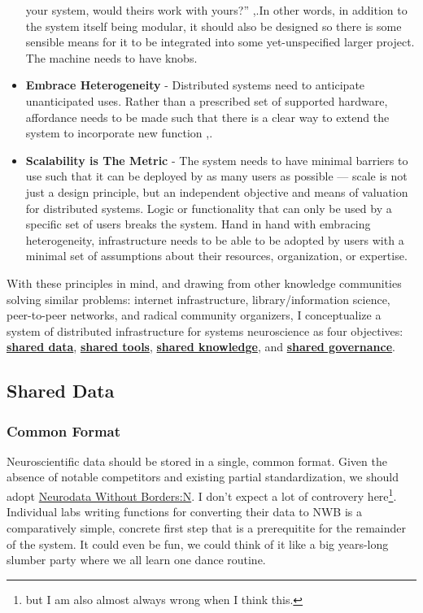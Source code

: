\documentclass{article}
\begin{document}
\begin{itemize}
  your system, would theirs work with yours?'' \cite{berners-leePrinciplesDesign1998},.In other words, in addition to
  the system itself being modular, it should also be designed so there
  is some sensible means for it to be integrated into some
  yet-unspecified larger project. The machine needs to have knobs.
\item
  \textbf{Embrace Heterogeneity} - Distributed systems need to
  anticipate unanticipated uses. Rather than a prescribed set of
  supported hardware, affordance needs to be made such that there is a
  clear way to extend the system to incorporate new function \cite{carpenterRFC1958Architectural1996},.\item
  \textbf{Scalability is The Metric} - The system needs to have minimal
  barriers to use such that it can be deployed by as many users as
  possible --- scale is not just a design principle, but an independent
  objective and means of valuation for distributed systems. Logic or
  functionality that can only be used by a specific set of users breaks
  the system. Hand in hand with embracing heterogeneity, infrastructure
  needs to be able to be adopted by users with a minimal set of
  assumptions about their resources, organization, or expertise.
\end{itemize}

With these principles in mind, and drawing from other knowledge
communities solving similar problems: internet infrastructure,
library/information science, peer-to-peer networks, and radical
community organizers, I conceptualize a system of distributed
infrastructure for systems neuroscience as four objectives:
\protect\hyperlink{shared-data}{\textbf{shared data}},
\protect\hyperlink{shared-tools}{\textbf{shared tools}},
\protect\hyperlink{shared-knowledge}{\textbf{shared knowledge}}, and
\protect\hyperlink{shared-governance}{\textbf{shared governance}}.

\hypertarget{shared-data}{%
\subsection{Shared Data}\label{shared-data}}

\hypertarget{common-format}{%
\subsubsection{Common Format}\label{common-format}}

Neuroscientific data should be stored in a single, common format. Given
the absence of notable competitors and existing partial standardization,
we should adopt \href{rubelNWBAccessibleData2019a}{Neurodata Without
Borders:N}. I don't expect a lot of controvery here\footnote{but I am
  also almost always wrong when I think this.}. Individual labs writing
functions for converting their data to NWB is a comparatively simple,
concrete first step that is a prerequitite for the remainder of the
system. It could even be fun, we could think of it like a big years-long
slumber party where we all learn one dance routine.
\end{document}
